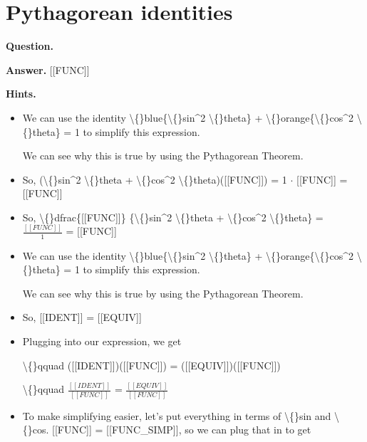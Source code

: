 \documentclass{article}
\begin{document}
\section*{Pythagorean identities}
\textbf{Question.} 

\textbf{Answer.} [[FUNC]]

\textbf{Hints.}
\begin{itemize}
  \item We can use the identity 
                    \textbackslash\{\}blue\{\textbackslash\{\}sin\textasciicircum{}2 \textbackslash\{\}theta\} + \textbackslash\{\}orange\{\textbackslash\{\}cos\textasciicircum{}2 \textbackslash\{\}theta\}
                        = 1
                    to simplify this expression.
                    
                    We can see why this is true by using the 
                    Pythagorean Theorem.
  \item So, (\textbackslash\{\}sin\textasciicircum{}2 \textbackslash\{\}theta + \textbackslash\{\}cos\textasciicircum{}2 \textbackslash\{\}theta)([[FUNC]]) 
                        = 1 $\cdot$ [[FUNC]] = [[FUNC]]
  \item So, \textbackslash\{\}dfrac\{[[FUNC]]\}
                        \{\textbackslash\{\}sin\textasciicircum{}2 \textbackslash\{\}theta + \textbackslash\{\}cos\textasciicircum{}2 \textbackslash\{\}theta\} = 
                        $\frac{[[FUNC]]}{1}$ = [[FUNC]]
  \item We can use the identity 
                    \textbackslash\{\}blue\{\textbackslash\{\}sin\textasciicircum{}2 \textbackslash\{\}theta\} + \textbackslash\{\}orange\{\textbackslash\{\}cos\textasciicircum{}2 \textbackslash\{\}theta\}
                        = 1
                    to simplify this expression.
                    
                    We can see why this is true by using the 
                    Pythagorean Theorem.
  \item So, [[IDENT]] = [[EQUIV]]
  \item Plugging into our expression, we get
                    
                        \textbackslash\{\}qquad
                            ([[IDENT]])([[FUNC]])
                            =
                            ([[EQUIV]])([[FUNC]]) 
                        
                    
                    
                        \textbackslash\{\}qquad
                            $\frac{[[IDENT]]}{[[FUNC]]}$
                            =
                            $\frac{[[EQUIV]]}{[[FUNC]]}$
  \item To make simplifying easier, let's put everything
                    in terms of \textbackslash\{\}sin and \textbackslash\{\}cos. 
                    [[FUNC]] = [[FUNC\_SIMP]],
                    so we can plug that in to get
                    

\end{itemize}
\end{document}
